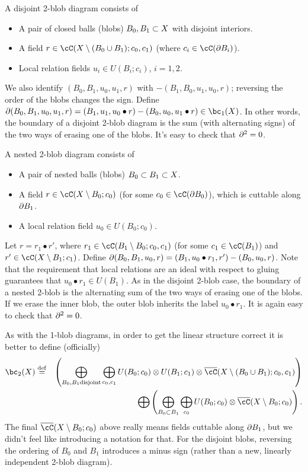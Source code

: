 \documentclass[11pt,leqno]{amsart}
\begin{document}
A disjoint 2-blob diagram consists of
\begin{itemize}
\item A pair of closed balls (blobs) $B_0, B_1 \subset X$ with disjoint interiors.
\item A field $r \in \cC(X \setmin (B_0 \cup B_1); c_0, c_1)$
(where $c_i \in \cC(\bd B_i)$).
\item Local relation fields $u_i \in U(B_i; c_i)$, $i=1,2$.
\end{itemize}
We also identify $(B_0, B_1, u_0, u_1, r)$ with $-(B_1, B_0, u_1, u_0, r)$;
reversing the order of the blobs changes the sign.
Define $\bd(B_0, B_1, u_0, u_1, r) = 
(B_1, u_1, u_0\bullet r) - (B_0, u_0, u_1\bullet r) \in \bc_1(X)$.
In other words, the boundary of a disjoint 2-blob diagram
is the sum (with alternating signs)
of the two ways of erasing one of the blobs.
It's easy to check that $\partial^2 = 0$.

A nested 2-blob diagram consists of
\begin{itemize}
\item A pair of nested balls (blobs) $B_0 \subset B_1 \subset X$.
\item A field $r \in \cC(X \setmin B_0; c_0)$
(for some $c_0 \in \cC(\bd B_0)$), which is cuttable along $\partial B_1$.
\item A local relation field $u_0 \in U(B_0; c_0)$.
\end{itemize}
Let $r = r_1 \bullet r'$, where $r_1 \in \cC(B_1 \setmin B_0; c_0, c_1)$
(for some $c_1 \in \cC(B_1)$) and
$r' \in \cC(X \setmin B_1; c_1)$.
Define $\partial(B_0, B_1, u_0, r) = (B_1, u_0\bullet r_1, r') - (B_0, u_0, r)$.
Note that the requirement that
local relations are an ideal with respect to gluing guarantees that $u_0\bullet r_1 \in U(B_1)$.
As in the disjoint 2-blob case, the boundary of a nested 2-blob is the alternating
sum of the two ways of erasing one of the blobs.
If we erase the inner blob, the outer blob inherits the label $u_0\bullet r_1$.
It is again easy to check that $\partial^2 = 0$.


As with the 1-blob diagrams, in order to get the linear structure correct it is better to define
(officially)
\begin{eqnarray*}
	\bc_2(X) & \deq &
	\left( 
		\bigoplus_{B_0, B_1 \text{disjoint}} \bigoplus_{c_0, c_1}
			U(B_0; c_0) \otimes U(B_1; c_1) \otimes \lf(X\setmin (B_0\cup B_1); c_0, c_1)
	\right) \\
	&& \bigoplus \left( 
		\bigoplus_{B_0 \subset B_1} \bigoplus_{c_0}
			U(B_0; c_0) \otimes \lf(X\setmin B_0; c_0)
	\right) .
\end{eqnarray*}
The final $\lf(X\setmin B_0; c_0)$ above really means fields cuttable along $\partial B_1$,
but we didn't feel like introducing a notation for that.
For the disjoint blobs, reversing the ordering of $B_0$ and $B_1$ introduces a minus sign
(rather than a new, linearly independent 2-blob diagram).
\end{document}
